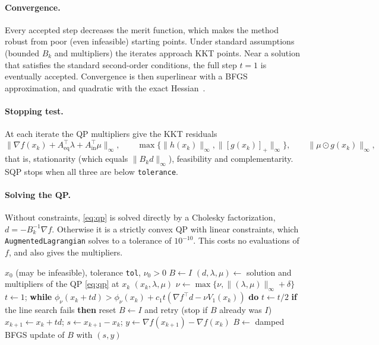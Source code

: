\documentclass[11pt,a4paper]{article}
\newcommand{\Aeq}{A_{\mathrm{eq}}}
\newcommand{\Ain}{A_{\mathrm{in}}}
\newcommand{\norm}[1]{\lVert #1\rVert}
\newcommand{\pos}[1]{\left[#1\right]_+}
\begin{document}
\paragraph{Convergence.}
Every accepted step decreases the merit function, which makes the method robust
from poor (even infeasible) starting points. Under standard assumptions (bounded
$B_k$ and multipliers) the iterates approach KKT points.
Near a solution that satisfies the standard second-order conditions, the full step $t=1$
is eventually accepted. Convergence is then superlinear with a BFGS
approximation, and quadratic with the exact Hessian~\cite{nocedal2006}.

\paragraph{Stopping test.}
At each iterate the QP multipliers give the KKT residuals
\[
  \norm{\nabla f(x_k)+\Aeq^\top\lambda+\Ain^\top\mu}_\infty,\qquad
  \max\{\norm{h(x_k)}_\infty,\norm{\pos{g(x_k)}}_\infty\},\qquad
  \norm{\mu\odot g(x_k)}_\infty ,
\]
that is, stationarity (which equals $\norm{B_k d}_\infty$), feasibility and complementarity.
SQP stops when all three are below \texttt{tolerance}.

\paragraph{Solving the QP.}
Without constraints, \eqref{eq:qp} is solved directly by a Cholesky factorization, $d=-B_k^{-1}\nabla f$.
Otherwise it is a strictly convex QP with linear constraints, which
\texttt{AugmentedLagrangian} solves to a tolerance of $10^{-10}$.
This costs no evaluations of $f$, and also gives the multipliers.

\begin{algorithm}[ht]
\caption{SQP with damped BFGS and $\ell_1$ merit line search}\label{alg:sqp}
\begin{algorithmic}[1]
\Require $x_0$ (may be infeasible), tolerance \texttt{tol}, $\nu_0>0$
\State $B\gets I$
  \State $(d,\lambda,\mu)\gets$ solution and multipliers of the QP \eqref{eq:qp} at $x_k$
   \Return $(x_k,\lambda,\mu)$ \EndIf
  \State $\nu\gets\max\{\nu,\norm{(\lambda,\mu)}_\infty+\delta\}$
  \State $t\gets 1$; \textbf{while} $\phi_\nu(x_k+td)>\phi_\nu(x_k)+c_1t(\nabla f^\top d-\nu V_1(x_k))$ \textbf{do} $t\gets t/2$
  \State \textbf{if} the line search fails \textbf{then} reset $B\gets I$ and retry (stop if $B$ already was $I$)
  \State $x_{k+1}\gets x_k+td$;\; $s\gets x_{k+1}-x_k$;\; $y\gets\nabla f(x_{k+1})-\nabla f(x_k)$
  \State $B\gets$ damped BFGS update of $B$ with $(s,y)$ 
\EndFor
\end{algorithmic}
\end{algorithm}
\end{document}
